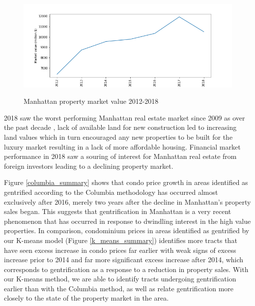 \begin{figure}[H]
    \centering
    \scalebox{0.5}  
    {\includegraphics{figs/manhattan_property_market.png}}
    \caption{Manhattan property market value 2012-2018}
    \label{manhattan_market_size}
\end{figure}

2018 saw the worst performing Manhattan real estate market since 2009 as over the past decade \cite{CNBC Manhattan real estate}, lack of available land for new construction led to increasing land values which in turn encouraged any new properties to be built for the luxury market resulting in a lack of more affordable housing. Financial market performance in 2018 saw a souring of interest for Manhattan real estate from foreign investors leading to a declining property market. 

Figure \ref{columbia_summary} shows that condo price growth in areas identified as gentrified according to the Columbia methodology has occurred almost exclusively after 2016, merely two years after the decline in Manhattan's property sales began. This suggests that gentrification in Manhattan is a very recent phenomenon that has occurred in response to dwindling interest in the high value properties. In comparison, condominium prices in areas identified as gentrified by our K-means model (Figure \ref{k_means_summary}) identifies more tracts that have seen excess increase in condo prices far earlier with weak signs of excess increase prior to 2014 and far more significant excess increase after 2014, which corresponds to gentrification as a response to a reduction in property sales. With our K-means method, we are able to identify tracts undergoing gentrification earlier than with the Columbia method, as well as relate gentrification more closely to the state of the property market in the area. 


